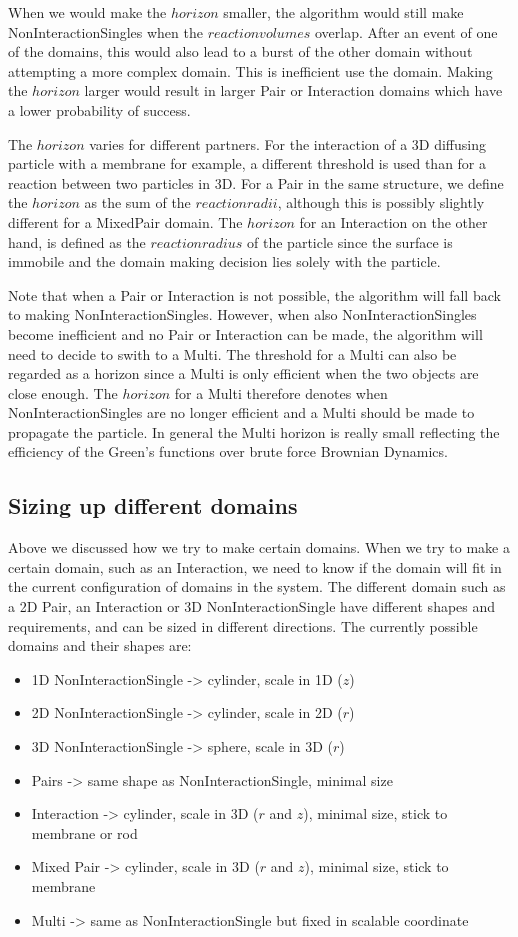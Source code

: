 \documentclass[a4paper,11pt]{article}
\begin{document}
When we would make the $horizon$ smaller, the algorithm would still make NonInteractionSingles when the $reaction volumes$
overlap. After an event of one of the domains, this would also lead to a burst of the other domain without attempting a more
complex domain. This is inefficient use the domain. Making the $horizon$ larger would result in larger Pair or Interaction
domains which have a lower probability of success.

The $horizon$ varies for different partners. For the interaction of a 3D diffusing particle with a membrane for
example, a different threshold is used than for a reaction between two particles in 3D.
For a Pair in the same structure, we define the $horizon$
as the sum of the $reaction radii$, although this is possibly slightly different for a MixedPair domain.
The $horizon$ for an Interaction on the other hand, is defined as the $reaction radius$ of the particle since the surface is
immobile and the domain making decision lies solely with the particle.

Note that when a Pair or Interaction is not possible, the algorithm will fall back to making NonInteractionSingles.
However, when also NonInteractionSingles become inefficient and no Pair or Interaction can be made, the algorithm will need to
decide to swith to a Multi. The threshold for a Multi can also be regarded as a horizon since a Multi is only efficient when
the two objects are close enough.
The $horizon$ for a Multi therefore denotes when NonInteractionSingles are no longer efficient and a Multi should be
made to propagate the particle. In general the Multi horizon is really small reflecting the efficiency of the Green's functions
over brute force Brownian Dynamics.


\subsection{Sizing up different domains}
Above we discussed how we try to make certain domains.
When we try to make a certain domain, such as an Interaction, we need to know if the domain will fit in the current configuration
of domains in the system.
The different domain such as a 2D Pair, an Interaction or 3D NonInteractionSingle have different shapes and requirements, and
can be sized in different directions. The currently possible domains and their shapes are:
\begin{itemize}
 \item 1D NonInteractionSingle -> cylinder, scale in 1D ($z$)
 \item 2D NonInteractionSingle -> cylinder, scale in 2D ($r$)
 \item 3D NonInteractionSingle -> sphere, scale in 3D ($r$)
 \item Pairs -> same shape as NonInteractionSingle, minimal size
 \item Interaction -> cylinder, scale in 3D ($r$ and $z$), minimal size, stick to membrane or rod
 \item Mixed Pair -> cylinder, scale in 3D ($r$ and $z$), minimal size, stick to membrane
 \item Multi -> same as NonInteractionSingle but fixed in scalable coordinate
\end{itemize}
\end{document}
